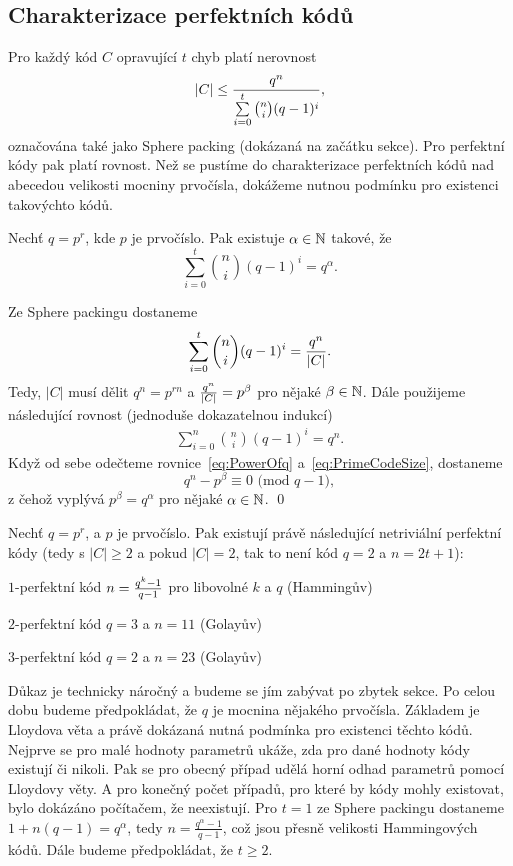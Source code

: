 \subsection{Charakterizace perfektních kódů}
Pro každý kód $C$ opravující $t$ chyb platí nerovnost
\[
|C| \leq { q^n \over \sum\limits_{i=0}^t \binom{n}{i} (q-1)^i },
\]
označována také jako Sphere packing (dokázaná na začátku sekce). Pro perfektní kódy pak platí rovnost. Než se pustíme do charakterizace perfektních kódů nad abecedou velikosti mocniny prvočísla, dokážeme nutnou podmínku pro existenci takovýchto kódů.

\vt Nechť $q=p^r$, kde $p$ je prvočíslo. Pak existuje $\alpha \in \mathbb{N}$ takové, že
\[
\sum\limits_{i=0}^t \binom{n}{i} (q-1)^i = q^\alpha.
\]

\dk Ze Sphere packingu dostaneme
\begin{align}
\sum\limits_{i=0}^t \binom{n}{i} (q-1)^i = { q^n \over |C| }. \label{eq:PrimeCodeSize}
\end{align}
Tedy, $|C|$ musí dělit $q^n = p^{rn}$ a ${ q^n \over |C| } = p^\beta$ pro nějaké $\beta \in \mathbb{N}$. Dále použijeme následující rovnost (jednoduše dokazatelnou indukcí)
\begin{align}
\sum\limits_{i=0}^n \binom{n}{i} (q-1)^i = q^n. \label{eq:PowerOfq}
\end{align}
Když od sebe odečteme rovnice~\ref{eq:PowerOfq} a~\ref{eq:PrimeCodeSize}, dostaneme
\[
q^n - p^\beta \equiv 0 \text{ (mod } q - 1),
\]
z čehož vyplývá $p^\beta = q^\alpha$ pro nějaké $\alpha \in \mathbb{N}$. \qed


\vt Nechť $q=p^r$, a $p$ je prvočíslo. Pak existují právě následující netriviální perfektní kódy (tedy s $|C| \geq 2$ a pokud $|C| = 2$, tak to není kód $q=2$ a $n=2t+1$):
\begin{description}
	\item $1$-perfektní kód $n={q^k-1 \over q-1}$ pro libovolné $k$ a $q$ (Hammingův)
	\item $2$-perfektní kód $q=3$ a $n=11$ (Golayův)
	\item $3$-perfektní kód $q=2$ a $n=23$ (Golayův)
\end{description}


Důkaz je technicky náročný a budeme se jím zabývat po zbytek sekce. Po celou dobu budeme předpokládat, že $q$ je mocnina nějakého prvočísla. Základem je Lloydova věta a právě dokázaná nutná podmínka pro existenci těchto kódů. Nejprve se pro malé hodnoty parametrů ukáže, zda pro dané hodnoty kódy existují či nikoli. Pak se pro obecný případ udělá horní odhad parametrů pomocí Lloydovy věty. A pro konečný počet případů, pro které by kódy mohly existovat, bylo dokázáno počítačem, že neexistují.  Pro $t = 1$ ze Sphere packingu dostaneme $1 + n(q - 1) = q^\alpha$, tedy $n = \frac{q^\alpha - 1}{q - 1}$, což jsou přesně velikosti Hammingových kódů. Dále budeme předpokládat, že $t \geq 2$.

